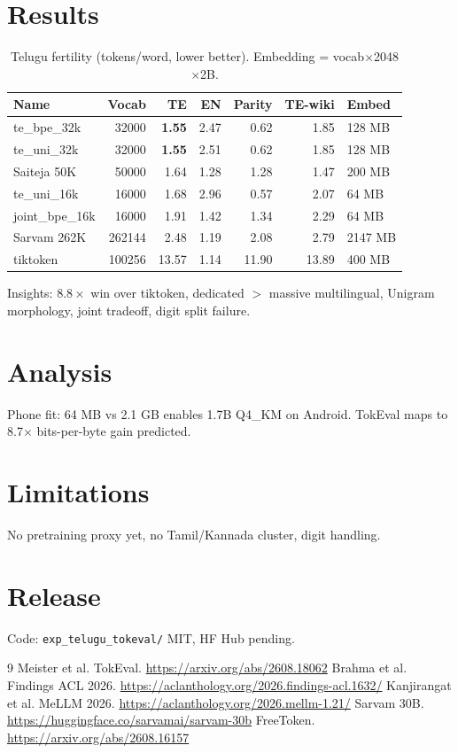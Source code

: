 \documentclass[11pt,a4paper]{article}
\begin{document}
\section{Results}
\begin{table}[h]
\centering
\small
\begin{tabular}{lrrrrrl}
\toprule
Name & Vocab & TE & EN & Parity & TE-wiki & Embed\\
\midrule
te\_bpe\_32k & 32000 & \textbf{1.55} & 2.47 & 0.62 & 1.85 & 128 MB\\
te\_uni\_32k & 32000 & \textbf{1.55} & 2.51 & 0.62 & 1.85 & 128 MB\\
Saiteja 50K & 50000 & 1.64 & 1.28 & 1.28 & 1.47 & 200 MB\\
te\_uni\_16k & 16000 & 1.68 & 2.96 & 0.57 & 2.07 & 64 MB\\
joint\_bpe\_16k & 16000 & 1.91 & 1.42 & 1.34 & 2.29 & 64 MB\\
Sarvam 262K & 262144 & 2.48 & 1.19 & 2.08 & 2.79 & 2147 MB\\
tiktoken & 100256 & 13.57 & 1.14 & 11.90 & 13.89 & 400 MB\\
\bottomrule
\end{tabular}
\caption{Telugu fertility (tokens/word, lower better). Embedding = vocab$\times$2048$\times$2B.}
\end{table}

Insights: $8.8\times$ win over tiktoken, dedicated $>$ massive multilingual, Unigram morphology, joint tradeoff, digit split failure.

\section{Analysis}
Phone fit: 64 MB vs 2.1 GB enables 1.7B Q4\_KM on Android. TokEval maps to 8.7$\times$ bits-per-byte gain predicted.

\section{Limitations}
No pretraining proxy yet, no Tamil/Kannada cluster, digit handling.

\section{Release}
Code: \texttt{exp\_telugu\_tokeval/} MIT, HF Hub pending.

\begin{thebibliography}{9}
 Meister et al. TokEval. \url{https://arxiv.org/abs/2608.18062}
 Brahma et al. Findings ACL 2026. \url{https://aclanthology.org/2026.findings-acl.1632/}
 Kanjirangat et al. MeLLM 2026. \url{https://aclanthology.org/2026.mellm-1.21/}
 Sarvam 30B. \url{https://huggingface.co/sarvamai/sarvam-30b}
 FreeToken. \url{https://arxiv.org/abs/2608.16157}
\end{thebibliography}
\end{document}
